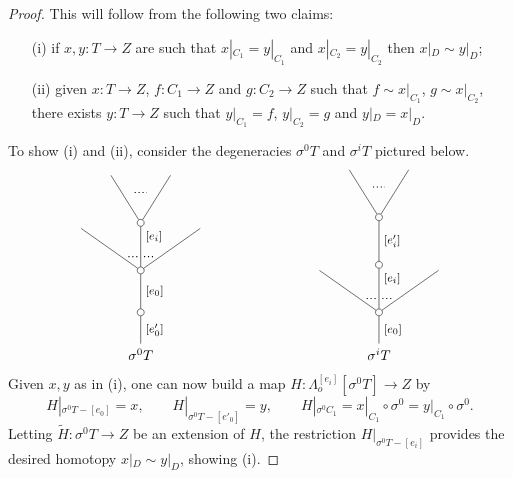 \documentclass[a4paper,10pt
,draft
]{article}%
\numberwithin{equation}{section}
\numberwithin{figure}{section}
\theoremstyle{definition} %
\newcommand{\1}{\ensuremath{\mathbbm 1}}%
\begin{document}
\begin{proof}
This will follow from the following two claims:
\begin{itemize}
\item[(i)] if $x,y \colon T \to Z$ are such that
$x|_{C_1} = y|_{C_1}$ and
$x|_{C_2} = y|_{C_2}$
then $x|_{D} \sim y|_{D}$;
\item[(ii)]
given $x \colon T \to Z$, $f\colon C_1 \to Z$ and
$g \colon C_2 \to Z$ such that
$f \sim x|_{C_1}$, $g \sim x|_{C_2}$,
there exists
$y \colon T \to Z$ such that
$y|_{C_1} = f$, $y|_{C_2} = g$ and
$y|_D = x|_D$.
\end{itemize}
To show (i) and (ii), consider the degeneracies
$\sigma^0 T$ and $\sigma^i T$ pictured below.
\[
\begin{tikzpicture}
[grow=up,auto,level distance=3em,
every node/.style = {font=\footnotesize},
dummy/.style={circle,draw,inner sep=0pt,minimum size=1.75mm}]
	\node at (0,0) [font=\normalsize]{$\sigma^0 T$}
		child{node [dummy] {}
		child{node [dummy] {}
			child{
			edge from parent node [swap,near end] {} node [near start,inner sep=1pt,name=Kn] {}}
			child[level distance=3.4em]{node [dummy] {}
				child{
				edge from parent node [swap,near end] {} node [name=Kn2] {}}
				child{
				edge from parent node [near end] {}
node [name=Kone2,swap] {}}
			edge from parent node [near end,swap] {$[e_i]$}
node [near start,inner sep=1pt,name=Kone,swap] {}
node [near start,inner sep=1pt,name=Kone1] {}}
			child{
			edge from parent node [near end] {}
node [swap] {}
node [near start,inner sep=1pt,name=Kn1,swap]{}}
		edge from parent node [swap] {$[e_0]$}}
		edge from parent node [swap] {$[e'_0]$}
		};
		\draw [dotted,thick] (Kone) -- (Kn) ;
		\draw [dotted,thick] (Kone1) -- (Kn1) ;
		\draw [dotted,thick] (Kone2) -- (Kn2) ;
	\node at (6,0) [font=\normalsize]{$\sigma^i T$}
		child{node [dummy] {}
			child{
			edge from parent node [swap,near end] {} node [near start,inner sep=1pt,name=Kn] {}}
			child[level distance=3.4em]{node [dummy] {}
			child{node [dummy] {}
				child{
				edge from parent node [swap,near end] {} node [name=Kn2] {}}
				child{
				edge from parent node [near end] {}
node [name=Kone2,swap] {}}
			edge from parent node [swap] {$[e'_i]$}}
			edge from parent node [near end,swap] {$[e_i]$}
node [near start,inner sep=1pt,name=Kone,swap] {}
node [near start,inner sep=1pt,name=Kone1] {}}
			child{
			edge from parent node [near end] {}
node [swap] {}
node [near start,inner sep=1pt,name=Kn1,swap]{}}
		edge from parent node [swap] {$[e_0]$}
		};
		\draw [dotted,thick] (Kone) -- (Kn) ;
		\draw [dotted,thick] (Kone1) -- (Kn1) ;
		\draw [dotted,thick] (Kone2) -- (Kn2) ;
\end{tikzpicture}
\]
Given $x,y$ as in (i), one can now build a map
$H \colon \Lambda_o^{[e_i]}[\sigma^0 T] \to Z$ by
\[
	H|_{\sigma^0 T - [e_0]} = x,
\qquad
	H|_{\sigma^0 T - [e'_0]} = y,
\qquad
	H|_{\sigma^0 C_1} = 
	x|_{C_1} \circ \sigma^0 = 
	y|_{C_1} \circ \sigma^0.
\]
Letting $\widetilde{H}\colon \sigma^0 T \to Z$
be an extension of $H$,
the restriction $H|_{\sigma^0 T - [e_i]}$
provides the desired homotopy 
$x|_{D} \sim y|_{D}$, showing (i).



\end{proof}
\end{document}

